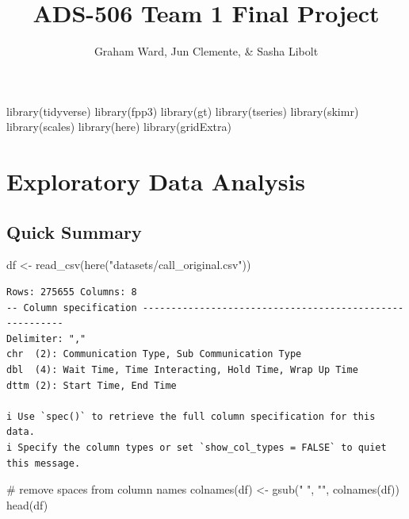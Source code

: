 \documentclass[
  letterpaper,
  DIV=11,
  numbers=noendperiod]{scrartcl}
\title{ADS-506 Team 1 Final Project}
\author{Graham Ward, Jun Clemente, \& Sasha Libolt}
\date{}
\newenvironment{Shaded}{\begin{snugshade}}{\end{snugshade}}
\newcommand{\CommentTok}[1]{\textcolor[rgb]{0.37,0.37,0.37}{#1}}
\newcommand{\FunctionTok}[1]{\textcolor[rgb]{0.28,0.35,0.67}{#1}}
\newcommand{\NormalTok}[1]{\textcolor[rgb]{0.00,0.23,0.31}{#1}}
\newcommand{\OtherTok}[1]{\textcolor[rgb]{0.00,0.23,0.31}{#1}}
\newcommand{\StringTok}[1]{\textcolor[rgb]{0.13,0.47,0.30}{#1}}
\begin{document}
\maketitle

\begin{Shaded}
\begin{Highlighting}[]
\FunctionTok{library}\NormalTok{(tidyverse)}
\FunctionTok{library}\NormalTok{(fpp3)}
\FunctionTok{library}\NormalTok{(gt)}
\FunctionTok{library}\NormalTok{(tseries)}
\FunctionTok{library}\NormalTok{(skimr)}
\FunctionTok{library}\NormalTok{(scales)}
\FunctionTok{library}\NormalTok{(here)}
\FunctionTok{library}\NormalTok{(gridExtra)}
\end{Highlighting}
\end{Shaded}

\section{Exploratory Data Analysis}\label{exploratory-data-analysis}

\subsection{Quick Summary}\label{quick-summary}

\begin{Shaded}
\begin{Highlighting}[]
\NormalTok{df }\OtherTok{\textless{}{-}} \FunctionTok{read\_csv}\NormalTok{(}\FunctionTok{here}\NormalTok{(}\StringTok{"datasets/call\_original.csv"}\NormalTok{))}
\end{Highlighting}
\end{Shaded}

\begin{verbatim}
Rows: 275655 Columns: 8
-- Column specification --------------------------------------------------------
Delimiter: ","
chr  (2): Communication Type, Sub Communication Type
dbl  (4): Wait Time, Time Interacting, Hold Time, Wrap Up Time
dttm (2): Start Time, End Time

i Use `spec()` to retrieve the full column specification for this data.
i Specify the column types or set `show_col_types = FALSE` to quiet this message.
\end{verbatim}

\begin{Shaded}
\begin{Highlighting}[]
\CommentTok{\# remove spaces from column names}
\FunctionTok{colnames}\NormalTok{(df) }\OtherTok{\textless{}{-}} \FunctionTok{gsub}\NormalTok{(}\StringTok{" "}\NormalTok{, }\StringTok{""}\NormalTok{, }\FunctionTok{colnames}\NormalTok{(df))}
\FunctionTok{head}\NormalTok{(df)}
\end{Highlighting}
\end{Shaded}
\end{document}
